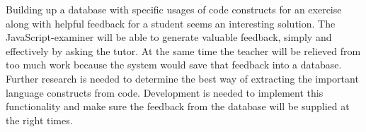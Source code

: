 Building up a database with specific usages of code constructs for an exercise
along with helpful feedback for a student seems an interesting solution. The
JavaScript-examiner will be able to generate valuable feedback, simply and
effectively by asking the tutor. At the same time the teacher will be relieved
from too much work because the system would save that feedback into a
database. Further research is needed to determine the best way of extracting
the important language constructs from code. Development is needed to implement
this functionality and make sure the feedback from the database will be
supplied at the right times.

